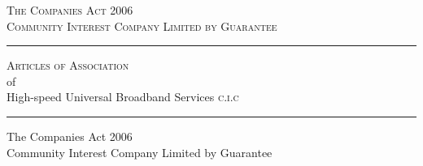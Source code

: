 \documentclass[tocflat]{article}
\newcommand{\companyname}{High-speed Universal Broadband Services
  \textsc{c.i.c}}%
\begin{document}
%

\thispagestyle{empty}%
\begin{center}%
  \textsc{The Companies Act 2006}\\
  \vspace{2em}%
  \textsc{Community Interest Company Limited by Guarantee}\\
  \vspace{8em}%
  \hrule
  \vspace{2em}%
  \textsc{Articles of Association}\\
  \vspace{1em}%
  of\\
  \vspace{1em}%
  \companyname\\
  \vspace{2em}%
  \hrule
\end{center}%
\newpage

\begin{center}%
  The Companies Act 2006\\
  Community Interest Company Limited by Guarantee\\
\end{center}%
\vspace{2em}%
\end{document}
